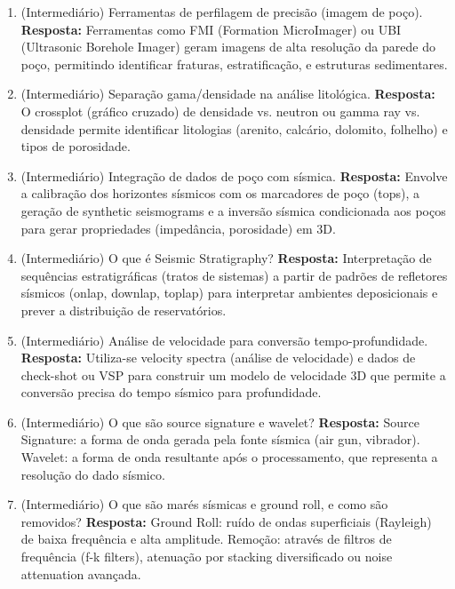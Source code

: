 \documentclass[11pt,a4paper]{article}
\begin{document}
\begin{enumerate}
  \item (Intermediário) Ferramentas de perfilagem de precisão (imagem de poço).
  \textbf{Resposta:} Ferramentas como FMI (Formation MicroImager) ou UBI (Ultrasonic Borehole Imager) geram imagens de alta resolução da parede do poço, permitindo identificar fraturas, estratificação, e estruturas sedimentares.

  \item (Intermediário) Separação gama/densidade na análise litológica.
  \textbf{Resposta:} O crossplot (gráfico cruzado) de densidade vs. neutron ou gamma ray vs. densidade permite identificar litologias (arenito, calcário, dolomito, folhelho) e tipos de porosidade.

  \item (Intermediário) Integração de dados de poço com sísmica.
  \textbf{Resposta:} Envolve a calibração dos horizontes sísmicos com os marcadores de poço (tops), a geração de synthetic seismograms e a inversão sísmica condicionada aos poços para gerar propriedades (impedância, porosidade) em 3D.

  \item (Intermediário) O que é Seismic Stratigraphy?
  \textbf{Resposta:} Interpretação de sequências estratigráficas (tratos de sistemas) a partir de padrões de refletores sísmicos (onlap, downlap, toplap) para interpretar ambientes deposicionais e prever a distribuição de reservatórios.

  \item (Intermediário) Análise de velocidade para conversão tempo-profundidade.
  \textbf{Resposta:} Utiliza-se velocity spectra (análise de velocidade) e dados de check-shot ou VSP para construir um modelo de velocidade 3D que permite a conversão precisa do tempo sísmico para profundidade.

  \item (Intermediário) O que são source signature e wavelet?
  \textbf{Resposta:} Source Signature: a forma de onda gerada pela fonte sísmica (air gun, vibrador). Wavelet: a forma de onda resultante após o processamento, que representa a resolução do dado sísmico.

  \item (Intermediário) O que são marés sísmicas e ground roll, e como são removidos?
  \textbf{Resposta:} Ground Roll: ruído de ondas superficiais (Rayleigh) de baixa frequência e alta amplitude. Remoção: através de filtros de frequência (f-k filters), atenuação por stacking diversificado ou noise attenuation avançada.


\end{enumerate}
\end{document}
